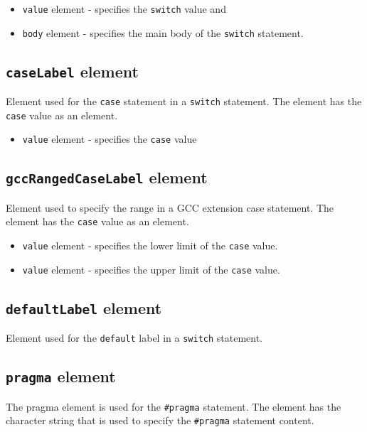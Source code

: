 \begin{itemize}
\item {\tt value} element - specifies the {\tt switch} value and
\item {\tt body} element - specifies the main body of the {\tt switch} statement.
\end{itemize}


\subsection{ {\tt caseLabel} element}

Element used for the {\tt case} statement in a {\tt switch} statement. The element has the {\tt case} value as an element.

\begin{itemize}
\item {\tt value} element - specifies the {\tt case} value
\end{itemize}


\subsection{ {\tt gccRangedCaseLabel} element}

Element used to specify the range in a GCC extension case statement. The element has the {\tt case} value as an element.

\begin{itemize}
\item {\tt value} element - specifies the lower limit of the {\tt case} value.
\item {\tt value} element - specifies the upper limit of the {\tt case} value.
\end{itemize}


\subsection{ {\tt defaultLabel} element}

Element used for the {\tt default} label in a {\tt switch} statement.


\subsection{ {\tt pragma} element}

The pragma element is used for the {\tt \#pragma} statement. The element has the character string that is used to specify the {\tt \#pragma} statement content.


